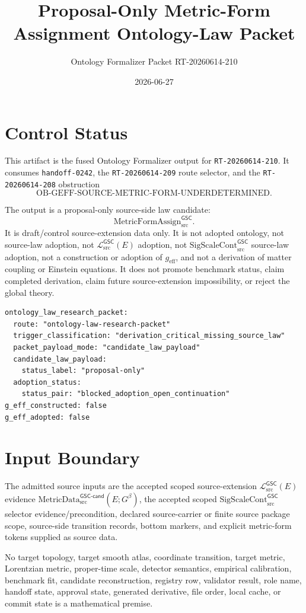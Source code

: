 \documentclass[11pt]{article}
\title{Proposal-Only Metric-Form Assignment Ontology-Law Packet}
\author{Ontology Formalizer Packet RT-20260614-210}
\date{2026-06-27}
\newcommand{\MetricDataCand}{\mathrm{MetricData}_{\mathrm{src}}^{\mathsf{GSC\mbox{-}cand}}}
\newcommand{\MetricData}{\mathcal{L}_{\mathrm{src}}^{\mathsf{GSC}}}
\newcommand{\Gbeta}{G^{\beta}}
\newcommand{\geff}{g_{\mathrm{eff}}}
\newcommand{\SigScaleCont}{\mathrm{SigScaleCont}_{\mathrm{src}}^{\mathsf{GSC}}}
\newcommand{\MetricFormAssign}{\mathrm{MetricFormAssign}_{\mathrm{src}}^{\mathsf{GSC}}}
\newcommand{\ObMetricForm}{\mathrm{OB\mbox{-}GEFF\mbox{-}SOURCE\mbox{-}METRIC\mbox{-}FORM\mbox{-}UNDERDETERMINED}}
\begin{document}
\maketitle

\section{Control Status}

This artifact is the fused Ontology Formalizer output for
\texttt{RT-20260614-210}. It consumes \texttt{handoff-0242}, the
\texttt{RT-20260614-209} route selector, and the
\texttt{RT-20260614-208} obstruction
\[
  \ObMetricForm .
\]

The output is a proposal-only source-side law candidate:
\[
  \MetricFormAssign .
\]
It is draft/control source-extension data only. It is not adopted ontology,
not source-law adoption, not \(\MetricData(E)\) adoption, not
\(\SigScaleCont\) source-law adoption, not a construction or adoption of
\(\geff\), and not a derivation of matter coupling or Einstein equations. It
does not promote benchmark status, claim completed derivation, claim future
source-extension impossibility, or reject the global theory.

\begin{verbatim}
ontology_law_research_packet:
  route: "ontology-law-research-packet"
  trigger_classification: "derivation_critical_missing_source_law"
  packet_payload_mode: "candidate_law_payload"
  candidate_law_payload:
    status_label: "proposal-only"
  adoption_status:
    status_pair: "blocked_adoption_open_continuation"
g_eff_constructed: false
g_eff_adopted: false
\end{verbatim}

\section{Input Boundary}

The admitted source inputs are the accepted scoped source-extension
\(\MetricData(E)\) evidence \(\MetricDataCand(E;\Gbeta)\), the accepted
scoped \(\SigScaleCont\) selector evidence/precondition, declared
source-carrier or finite source package scope, source-side transition records,
bottom markers, and explicit metric-form tokens supplied as source data.

No target topology, target smooth atlas, coordinate transition, target metric,
Lorentzian metric, proper-time scale, detector semantics, empirical
calibration, benchmark fit, candidate reconstruction, registry row, validator
result, role name, handoff state, approval state, generated derivative, file
order, local cache, or commit state is a mathematical premise.
\end{document}
